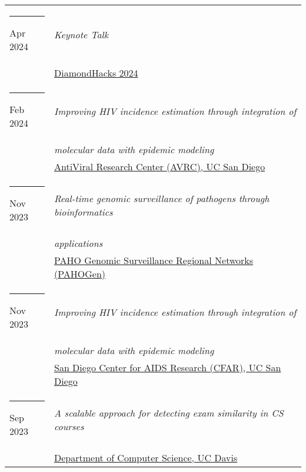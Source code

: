 \documentclass[margin,line]{res}
\begin{document}
\begin{resume}
\begin{longtable}{@{}p{0.7in}p{4in}}
\hspace*{-4mm} \rule{-1mm}{5mm} Apr 2024 & \textit{Keynote Talk}\\*
\hspace*{-4mm} & \hspace{4mm} \href{https://diamondhacks-2024.devpost.com/}{DiamondHacks 2024}\\
\hspace*{-4mm} \rule{-1mm}{5mm} Feb 2024 & \textit{Improving HIV incidence estimation through integration of}\\*
\hspace*{-4mm} & \hspace{4mm} \textit{molecular data with epidemic modeling}\\*
\hspace*{-4mm} & \hspace{4mm} \href{https://medschool.ucsd.edu/som/medicine/research/centers/avrc/pages/default.aspx}{AntiViral Research Center (AVRC), UC San Diego}\\
\hspace*{-4mm} \rule{-1mm}{5mm} Nov 2023 & \textit{Real-time genomic surveillance of pathogens through bioinformatics}\\*
\hspace*{-4mm} & \hspace{4mm} \textit{applications}\\*
\hspace*{-4mm} & \hspace{4mm} \href{https://www.paho.org/}{PAHO Genomic Surveillance Regional Networks (PAHOGen)}\\
\hspace*{-4mm} \rule{-1mm}{5mm} Nov 2023 & \textit{Improving HIV incidence estimation through integration of}\\*
\hspace*{-4mm} & \hspace{4mm} \textit{molecular data with epidemic modeling}\\*
\hspace*{-4mm} & \hspace{4mm} \href{https://cfar.ucsd.edu/}{San Diego Center for AIDS Research (CFAR), UC San Diego}\\
\hspace*{-4mm} \rule{-1mm}{5mm} Sep 2023 & \textit{A scalable approach for detecting exam similarity in CS courses}\\*
\hspace*{-4mm} & \hspace{4mm} \href{https://cs.ucdavis.edu/}{Department of Computer Science, UC Davis}\\

\end{longtable}
\end{resume}
\end{document}
